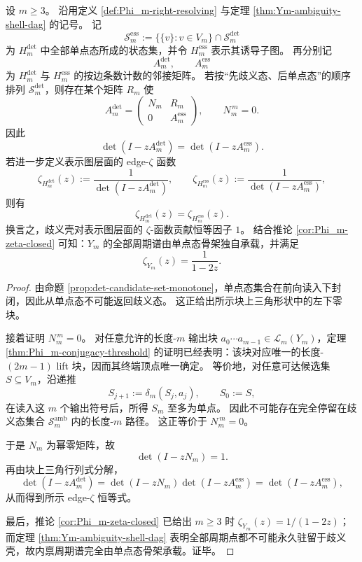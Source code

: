 \begin{theorem}\label{thm:Ym-ambiguity-shell-zeta-factor-trivial}
设 \(m\ge 3\)。
沿用定义 \ref{def:Phi_m-right-resolving} 与定理 \ref{thm:Ym-ambiguity-shell-dag} 的记号。
记
\[
\mathcal S_m^{\mathrm{ess}}
:=
\bigl\{\{v\}:v\in V_m\bigr\}\cap \mathcal S_m^{\mathrm{det}}
\]
为 \(H_m^{\mathrm{det}}\) 中全部单点态所成的状态集，并令 \(H_m^{\mathrm{ess}}\) 表示其诱导子图。
再分别记
\[
A_m^{\mathrm{det}},\qquad A_m^{\mathrm{ess}}
\]
为 \(H_m^{\mathrm{det}}\) 与 \(H_m^{\mathrm{ess}}\) 的按边条数计数的邻接矩阵。
若按“先歧义态、后单点态”的顺序排列 \(\mathcal S_m^{\mathrm{det}}\)，则存在某个矩阵 \(R_m\) 使
\[
\boxed{\;
A_m^{\mathrm{det}}
=
\begin{pmatrix}
N_m & R_m\\
0 & A_m^{\mathrm{ess}}
\end{pmatrix},
\qquad
N_m^{\,m}=0.\;}
\]
因此
\[
\boxed{\;
\det(I-zA_m^{\mathrm{det}})
=
\det(I-zA_m^{\mathrm{ess}}).\;}
\]
若进一步定义表示图层面的 edge-\(\zeta\) 函数
\[
\zeta_{H_m^{\mathrm{det}}}(z):=\frac{1}{\det(I-zA_m^{\mathrm{det}})},
\qquad
\zeta_{H_m^{\mathrm{ess}}}(z):=\frac{1}{\det(I-zA_m^{\mathrm{ess}})},
\]
则有
\[
\boxed{\;
\zeta_{H_m^{\mathrm{det}}}(z)=\zeta_{H_m^{\mathrm{ess}}}(z).\;}
\]
换言之，歧义壳对表示图层面的 \(\zeta\)-函数贡献恒等因子 \(1\)。
结合推论 \ref{cor:Phi_m-zeta-closed} 可知：\(Y_m\) 的全部周期谱由单点态骨架独自承载，并满足
\[
\zeta_{Y_m}(z)=\frac{1}{1-2z}.
\]
\end{theorem}
\begin{proof}
由命题 \ref{prop:det-candidate-set-monotone}，单点态集合在前向读入下封闭，因此从单点态不可能返回歧义态。
这正给出所示块上三角形状中的左下零块。

接着证明 \(N_m^{\,m}=0\)。
对任意允许的长度-\(m\) 输出块 \(a_0\cdots a_{m-1}\in\mathcal L_m(Y_m)\)，定理 \ref{thm:Phi_m-conjugacy-threshold} 的证明已经表明：该块对应唯一的长度-\((2m-1)\) lift 块，因而其终端顶点唯一确定。
等价地，对任意可达候选集 \(S\subseteq V_m\)，沿递推
\[
S_{j+1}:=\delta_m(S_j,a_j),
\qquad
S_0:=S,
\]
在读入这 \(m\) 个输出符号后，所得 \(S_m\) 至多为单点。
因此不可能存在完全停留在歧义态集合 \(\mathcal S_m^{\mathrm{amb}}\) 内的长度-\(m\) 路径。
这正等价于 \(N_m^{\,m}=0\)。

于是 \(N_m\) 为幂零矩阵，故
\[
\det(I-zN_m)=1.
\]
再由块上三角行列式分解，
\[
\det(I-zA_m^{\mathrm{det}})
=
\det(I-zN_m)\det(I-zA_m^{\mathrm{ess}})
=
\det(I-zA_m^{\mathrm{ess}}),
\]
从而得到所示 edge-\(\zeta\) 恒等式。

最后，推论 \ref{cor:Phi_m-zeta-closed} 已给出 \(m\ge 3\) 时
\(
\zeta_{Y_m}(z)=1/(1-2z)
\)；
而定理 \ref{thm:Ym-ambiguity-shell-dag} 表明全部周期点都不可能永久驻留于歧义壳，故内禀周期谱完全由单点态骨架承载。证毕。
\end{proof}

